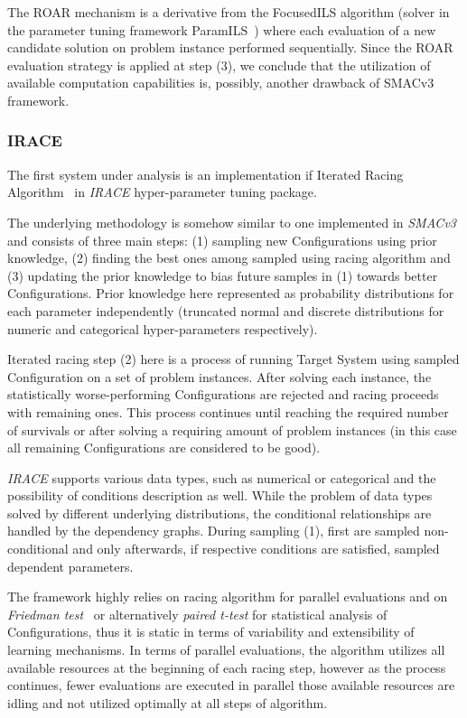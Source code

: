 The ROAR mechanism is a derivative from the FocusedILS algorithm (solver in the parameter tuning framework ParamILS~\cite{hutter2009paramils}) where each evaluation of a new candidate solution on problem instance performed sequentially. Since the ROAR evaluation strategy is applied at step (3), we conclude that the utilization of available computation capabilities is, possibly, another drawback of SMACv3 framework.


\subsubsection{IRACE~\cite{lopez2016irace}}\label{bg: irace}
The first system under analysis is an implementation if Iterated Racing Algorithm~\cite{birattari2010f} in \textit{IRACE} hyper-parameter tuning package.

The underlying methodology is somehow similar to one implemented in \textit{SMACv3} and consists of three main steps: (1) sampling new Configurations using prior knowledge, (2) finding the best ones among sampled using racing algorithm and (3) updating the prior knowledge to bias future samples in (1) towards better Configurations. 
Prior knowledge here represented as probability distributions for each parameter independently (truncated normal and discrete distributions for numeric and categorical hyper-parameters respectively).%

Iterated racing step (2) here is a process of running Target System using sampled Configuration on a set of problem instances. After solving each instance, the statistically worse-performing Configurations are rejected and racing proceeds with remaining ones. This process continues until reaching the required number of survivals or after solving a requiring amount of problem instances (in this case all remaining Configurations are considered to be good). 

\textit{IRACE} supports various data types, such as numerical or categorical and the possibility of conditions description as well. While the problem of data types solved by different underlying distributions, the conditional relationships are handled by the dependency graphs. During sampling (1), first are sampled non-conditional and only afterwards, if respective conditions are satisfied, sampled dependent parameters. 

The framework highly relies on racing algorithm for parallel evaluations and on \textit{Friedman test}~\cite{conover1980practical} or alternatively \textit{paired t-test} for statistical analysis of Configurations, thus it is static in terms of variability and extensibility of learning mechanisms. 
In terms of parallel evaluations, the algorithm utilizes all available resources at the beginning of each racing step, however as the process continues, fewer evaluations are executed in parallel those available resources are idling and not utilized optimally at all steps of algorithm.


